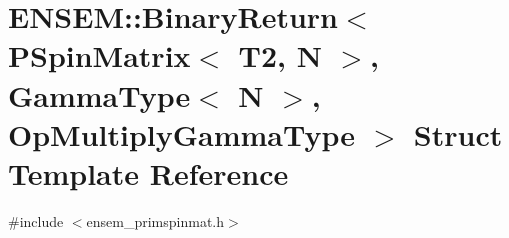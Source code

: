 \hypertarget{structENSEM_1_1BinaryReturn_3_01PSpinMatrix_3_01T2_00_01N_01_4_00_01GammaType_3_01N_01_4_00_01OpMultiplyGammaType_01_4}{}\section{E\+N\+S\+EM\+:\+:Binary\+Return$<$ P\+Spin\+Matrix$<$ T2, N $>$, Gamma\+Type$<$ N $>$, Op\+Multiply\+Gamma\+Type $>$ Struct Template Reference}
\label{structENSEM_1_1BinaryReturn_3_01PSpinMatrix_3_01T2_00_01N_01_4_00_01GammaType_3_01N_01_4_00_01OpMultiplyGammaType_01_4}


{\ttfamily \#include $<$ensem\+\_\+primspinmat.\+h$>$}

